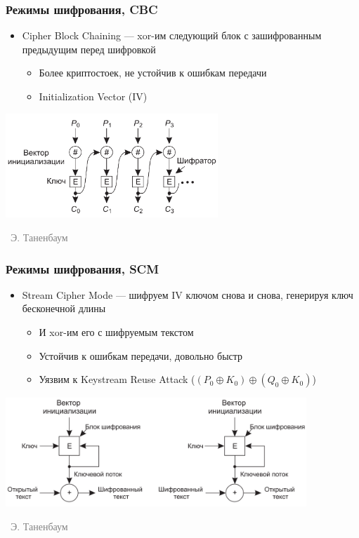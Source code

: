 \documentclass[xetex,mathserif,serif]{beamer}
\newcommand{\attribution}[1] {
\vspace{-5mm}\begin{flushright}\begin{scriptsize}\textcolor{gray}{\textcopyright\, #1}\end{scriptsize}\end{flushright}
}
\begin{document}
	\begin{frame}
		\frametitle{Режимы шифрования, CBC}
		\begin{itemize}
			\item Cipher Block Chaining --- xor-им следующий блок с зашифрованным предыдущим перед шифровкой
			\begin{itemize}
				\item Более криптостоек, не устойчив к ошибкам передачи
				\item Initialization Vector (IV)
			\end{itemize}
		\end{itemize}
		\begin{center}
			\includegraphics[width=0.6\textwidth]{cbc.png}
			\attribution{Э. Таненбаум}
		\end{center}
	\end{frame}

	\begin{frame}
		\frametitle{Режимы шифрования, SCM}
		\begin{itemize}
			\item Stream Cipher Mode --- шифруем IV ключом снова и снова, генерируя ключ бесконечной длины
			\begin{itemize}
				\item И xor-им его с шифруемым текстом
				\item Устойчив к ошибкам передачи, довольно быстр
				\item Уязвим к Keystream Reuse Attack ($(P_0 \oplus K_0) \oplus (Q_0 \oplus K_0)$)
			\end{itemize}
		\end{itemize}
		\begin{center}
			\includegraphics[width=0.85\textwidth]{scm.png}
			\attribution{Э. Таненбаум}
		\end{center}
	\end{frame}
\end{document}

